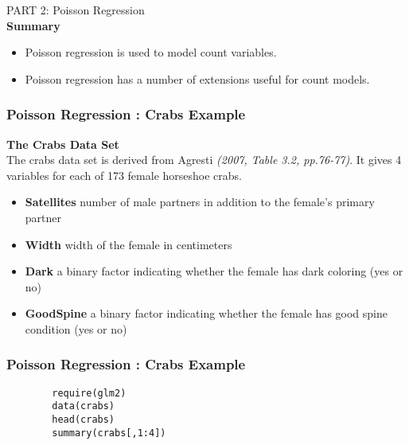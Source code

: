 \documentclass[MASTER.tex]{subfiles}
\begin{document}
\begin{frame}
	
	{\LARGE
	PART 2:	Poisson Regression \\
	} \bigskip
	\Large
\medskip
\noindent \textbf{Summary}

	\begin{itemize}
		\item Poisson regression is used to model count variables.
		\item Poisson regression has a number of extensions useful for count models.
	\end{itemize}
\end{frame}

\begin{frame}[fragile]
	\frametitle{Poisson Regression :  Crabs Example}%
	\textbf{The Crabs Data Set}\\
	The crabs data set is derived from Agresti \textit{(2007, Table 3.2, pp.76-77)}. It gives 4 variables for each of 173 female horseshoe crabs. \medskip
	\begin{itemize}
		\item \textbf{Satellites}
		number of male partners in addition to the female's primary partner
		
		\item \textbf{Width}
		width of the female in centimeters
		
		\item \textbf{Dark}
		a binary factor indicating whether the female has dark coloring (yes or no)
		
		\item \textbf{GoodSpine}
		a binary factor indicating whether the female has good spine condition (yes or no)
	\end{itemize}
\end{frame}
\begin{frame}[fragile]
\frametitle{Poisson Regression :  Crabs Example}
\large
	\begin{framed}
		\begin{verbatim}
		require(glm2)
		data(crabs)
		head(crabs)
		summary(crabs[,1:4])
	\end{verbatim}
		\end{framed}
	\end{frame}
\end{document}

